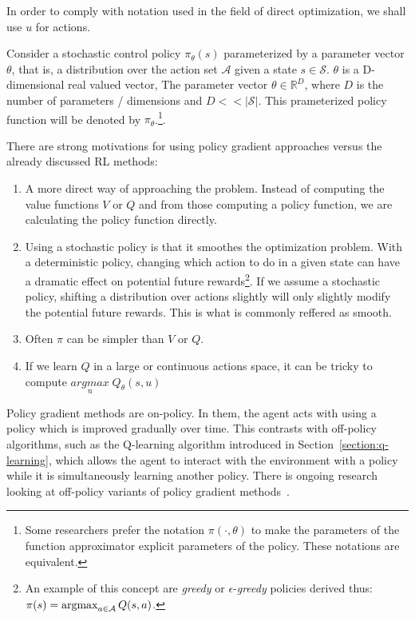 \documentclass{../main.tex}{subfiles}
\begin{document}
In order to comply with notation used in the field of direct optimization, we shall use $u$ for actions.

Consider a stochastic control policy  $\pi_{\theta}(s)$ parameterized by a parameter vector $\theta$, that is, a distribution over the action set $\mathcal{A}$ given a state $s \in \mathcal{S}$. $\theta$ is a D-dimensional real valued vector, The parameter vector $\theta \in \mathbb{R}^{D}$, where $D$ is the number of parameters / dimensions and $D << |\mathcal{S}|$. This prameterized policy function will be denoted by $\pi_{\theta}$.\footnote{Some researchers prefer the notation $\pi(\cdot, \theta)$ to make the parameters of the function approximator explicit parameters of the policy. These notations are equivalent.}. 

There are strong motivations for using policy gradient approaches versus the already discussed RL methods:
\begin{enumerate}
\item A more direct way of approaching the problem. Instead of computing the value functions $V$ or $Q$ and from those computing a policy function, we are calculating the policy function directly.
\item Using a stochastic policy is that it smoothes the optimization problem. With a deterministic policy, changing which action to do in a given state can have a dramatic effect on potential future rewards\footnote{An example of this concept are \textit{greedy} or $\epsilon$-\textit{greedy} policies derived thus: $\pi(s) = \operatorname*{argmax}_{a \in \mathcal{A}} Q(s,a)$.}. If we assume a stochastic policy, shifting a distribution over actions slightly will only slightly modify the potential future rewards. This is what is commonly reffered as smooth.
\item Often $\pi$ can be simpler than $V$ or $Q$.
\item If we learn $Q$ in a large or continuous actions space, it can be tricky to compute $\underset{\text{u}}{argmax}\; Q_{\theta}(s,u)$
\end{enumerate}
 
Policy gradient methods are on-policy. In them, the agent acts with using a policy which is improved gradually over time. This contrasts with off-policy algorithms, such as the Q-learning algorithm introduced in Section~\ref{section:q-learning}, which allows the agent to interact with the environment with a policy while it is simultaneously learning another policy. There is ongoing research looking at off-policy variants of policy gradient methods~\citep{Mnih2013, Mnih2016}. 
\end{document}
